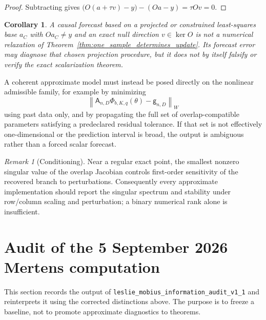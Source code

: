 \documentclass[11pt]{amsart}
\numberwithin{equation}{section}
\theoremstyle{plain}
\newtheorem{corollary}[theorem]{Corollary}
\theoremstyle{definition}
\theoremstyle{remark}
\newtheorem{remark}[theorem]{Remark}
\begin{document}
\begin{proof}
Subtracting gives $\bigl(O(a+\tau v)-y\bigr)-(Oa-y)=\tau Ov=0$.
\end{proof}

\begin{corollary}
\label{cor:projected_pipeline_not_theorem_test}
A causal forecast based on a projected or constrained least-squares base $a_C$ with $Oa_C\neq y$ and an exact null direction $v\in\ker O$ is not a numerical relaxation of Theorem~\ref{thm:one_sample_determines_update}. Its forecast error may diagnose that chosen projection procedure, but it does not by itself falsify or verify the exact scalarization theorem.
\end{corollary}

A coherent approximate model must instead be posed directly on the nonlinear admissible family, for example by minimizing
\begin{equation}
\left\|\mathsf A_{n,D}\Phi_{b,K,q}(\theta)-\mathsf g_{n,D}\right\|_W
\label{eq:proper_approximate_fit}
\end{equation}
using past data only, and by propagating the full set of overlap-compatible parameters satisfying a predeclared residual tolerance. If that set is not effectively one-dimensional or the prediction interval is broad, the output is ambiguous rather than a forced scalar forecast.

\begin{remark}[Conditioning]
\label{rem:approximate_conditioning}
Near a regular exact point, the smallest nonzero singular value of the overlap Jacobian controls first-order sensitivity of the recovered branch to perturbations. Consequently every approximate implementation should report the singular spectrum and stability under row/column scaling and perturbation; a binary numerical rank alone is insufficient.
\end{remark}

\section{Audit of the 5 September 2026 Mertens computation}
\label{sec:2026_audit}

This section records the output of \texttt{leslie\_mobius\_information\_audit\_v1\_1} and reinterprets it using the corrected distinctions above. The purpose is to freeze a baseline, not to promote approximate diagnostics to theorems.
\end{document}

